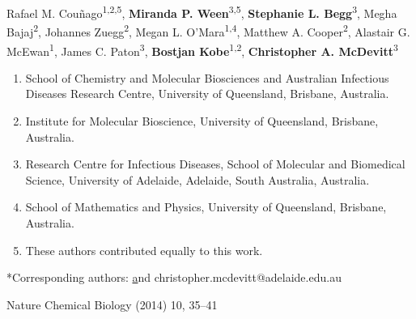 Rafael M. Couñago\textsuperscript{1,2,5}, \textbf{Miranda P. Ween}\textsuperscript{3,5}, \textbf{Stephanie L. Begg}\textsuperscript{3}, Megha Bajaj\textsuperscript{2}, Johannes Zuegg\textsuperscript{2}, Megan L. O’Mara\textsuperscript{1,4}, Matthew A. Cooper\textsuperscript{2}, Alastair G. McEwan\textsuperscript{1}, James C. Paton\textsuperscript{3}, \textbf{Bostjan Kobe}\textsuperscript{1,2}, \textbf{Christopher A. McDevitt}\textsuperscript{3}
\begin{enumerate}
\item School of Chemistry and Molecular Biosciences and Australian Infectious Diseases Research Centre, University of Queensland, Brisbane, Australia.
\item Institute for Molecular Bioscience, University of Queensland, Brisbane, Australia.
\item Research Centre for Infectious Diseases, School of Molecular and Biomedical Science, University of Adelaide, Adelaide, South Australia, Australia.
\item School of Mathematics and Physics, University of Queensland, Brisbane, Australia.
\item These authors contributed equally to this work.
\end{enumerate}

*Corresponding authors: \href{b.kobe@uq.edu.au} and christopher.mcdevitt@adelaide.edu.au 

Nature Chemical Biology (2014) 10, 35–41